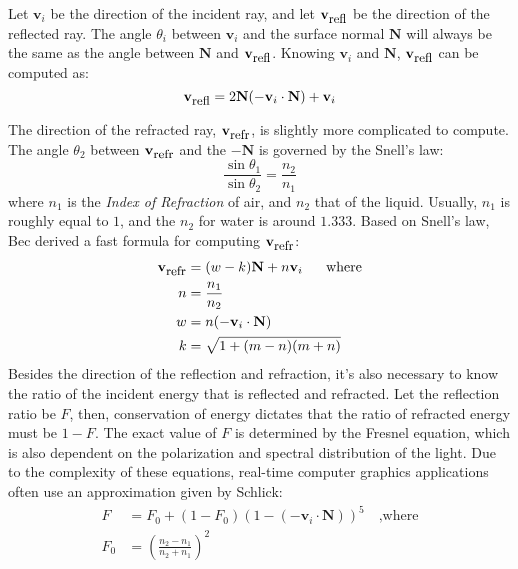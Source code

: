 Let $\textbf{v}_i$ be the direction of the incident ray, and let $\textbf{v}_{\mbox{\small{refl}}}$ be the direction of the reflected ray. The angle $\theta_i$ between $\textbf{v}_i$ and the surface normal $\textbf{N}$ will always be the same as the angle between $\textbf{N}$ and $\textbf{v}_{\mbox{\small{refl}}}$. Knowing $\textbf{v}_i$ and $\textbf{N}$, $\textbf{v}_{\mbox{\small{refl}}}$ can be computed as:
\begin{equation}
    \label{eqn direction of reflection}
    \textbf{v}_{\mbox{\small{refl}}} = 2\textbf{N}(-\textbf{v}_i \cdot \textbf{N}) + \textbf{v}_i
\end{equation}

The direction of the refracted ray, $\textbf{v}_{\mbox{\small{refr}}}$, is slightly more complicated to compute. The angle $\theta_2$ between $\textbf{v}_{\mbox{\small{refr}}}$ and the $-\textbf{N}$ is governed by the Snell's law:
$$
\frac{\sin\theta_1}{\sin\theta_2}=\frac{n_2}{n_1}
$$
where $n_1$ is the \textit{Index of Refraction} of air, and $n_2$ that of the liquid. Usually, $n_1$ is roughly equal to $1$, and the $n_2$ for water is around $1.333$. Based on Snell's law, Bec\cite{bec1997faster} derived a fast formula for computing $\textbf{v}_{\mbox{\small{refr}}}$:
\begin{equation}
    \label{eqn direction of refraction}
    \begin{aligned}
        \textbf{v}_{\mbox{\small{refr}}} &= (w-k)\textbf{N} + n\textbf{v}_{i}\mbox{~~~~ where}\\
        n &= \frac{n_1}{n_2}\\
        w &= n(-\textbf{v}_i \cdot \textbf{N}) \\
        k &= \sqrt{1+(m-n)(m+n)} 
    \end{aligned}
\end{equation}
Besides the direction of the reflection and refraction, it's also necessary to know the ratio of the incident energy that is reflected and refracted. Let the reflection ratio be $F$, then, conservation of energy dictates that the ratio of refracted energy must be $1-F$. The exact value of $F$ is determined by the Fresnel equation, which is also dependent on the polarization and spectral distribution of the light. Due to the complexity of these equations, real-time computer graphics applications often use an approximation given by Schlick\cite{schlick1994inexpensive}:
\begin{equation}
    \label{eqn Schlick}
    \begin{aligned}
        F &= F_0 + (1-F_0)(1-(-\textbf{v}_i \cdot \textbf{N}))^5\mbox{~~~,where}\\
        F_0 &= \left(\frac{n_2-n_1}{n_2+n_1}\right)^2
    \end{aligned}
\end{equation}


